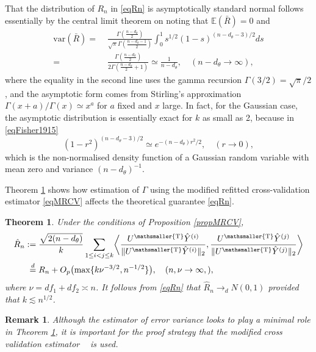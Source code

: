 \documentclass[10pt, reqno]{amsart}
\newtheorem{theorem}{Theorem}[section]
\newtheorem{remark}{Remark}[section]
\numberwithin{equation}{section}
\newcommand{\mrcv}{\mathop{\hat{\sigma}^2_{\mathrm{mrcv}}}}
\newcommand{\T}{{\mathsmaller {\rm T}}}
\begin{document}
%
That the distribution of $R_n$ in \eqref{eqRn} is asymptotically standard normal follows essentially by the central limit theorem on noting that $\mathbb{E}(\bar{R})=0$ and
\begin{align*}
	\text{var}(\bar{R})  = & \;\frac{\Gamma(\tfrac{n-d_\theta}{2})}{\sqrt{\pi}\Gamma(\tfrac{n-d_\theta-1}{2})} \int_{0}^{1} s^{1/2}(1-s)^{(n-d_\theta-3)/2}ds \\
	=& \;  \frac{\Gamma(\tfrac{n-d_\theta}{2})}{2\Gamma(\tfrac{n-d_\theta}{2}+1)} \simeq \frac{1}{n-d_\theta}, \quad (n-d_\theta\rightarrow \infty),
\end{align*}
%
where the equality in the second line uses the gamma recursion $\Gamma(3/2)=\sqrt{\pi}/2$, and the asymptotic form comes from Stirling's approximation $\Gamma(x+a)/\Gamma(x)\simeq x^a$ for $a$ fixed and $x$ large. In fact, for the Gaussian case, the asymptotic distribution is essentially exact for $k$ as small as 2, because in \eqref{eqFisher1915}
%
\begin{equation}\label{eqFisherApprox}
	(1-r^2)^{(n-d_\theta - 3)/2}\simeq e^{-(n-d_\theta)r^2/2}, \quad (r\rightarrow 0),
\end{equation}
which is the non-normalised density function of a Gaussian random variable with mean zero and variance $(n-d_\theta)^{-1}$.


Theorem \ref{corrRayleigh} shows how estimation of $\Gamma$ using the modified refitted cross-validation estimator \eqref{eqMRCV} affects the theoretical guarantee \eqref{eqRn}. 

\begin{theorem}\label{corrRayleigh}
	Under the conditions of Proposition \ref{propMRCV}, 
	\begin{align*}
		\hat{R}_n := & \; \frac{\sqrt{2(n - d_\theta)}}{k} \sum_{1 \leq i < j \leq k} \biggl< \frac{U^\T \hat{Y}^{(i)}}{\lVert U^\T \hat{Y}^{(i)} \rVert_2} , \frac{U^\T \hat{Y}^{(j)}}{\lVert U^\T \hat{Y}^{(j)} \rVert_2} \biggr> \\
		\stackrel{d}{=} & \; R_n + 
		O_{p}\bigl(\max\{k\nu^{-3/2}, n^{-1/2}\}\bigr), \quad (n, \nu \rightarrow \infty,),
	\end{align*}
	where $\nu=df_1+df_2 \asymp n$. It follows from \eqref{eqRn} that $\hat{R}_n \rightarrow_d N(0,1)$ provided that $k\lesssim n^{1/2}$.
\end{theorem}

\begin{remark} 
	Although the estimator of error variance looks to play a minimal role in Theorem \ref{corrRayleigh}, it is important for the proof strategy that the modified cross validation estimator $\mrcv$ is used. 
\end{remark}
\end{document}
